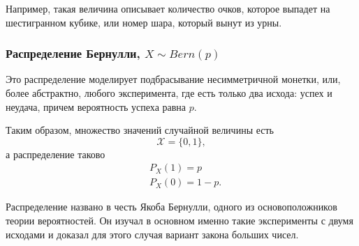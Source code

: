 \documentclass[a4paper,12pt]{article}
\newcounter{z-counter}
\newcounter{th-counter}
\begin{document}
Например, такая величина описывает количество очков, которое выпадет на шестигранном кубике, или номер шара, который вынут из урны.

\subsubsection*{Распределение Бернулли, $X \sim Bern(p)$}
Это распределение моделирует подбрасывание несимметричной монетки, или, более абстрактно, любого эксперимента, где есть только два исхода: успех и неудача, причем вероятность успеха равна $p$.

Таким образом, множество значений случайной величины есть
\[
\mathcal{X} = \{0, 1\},
\]
а распределение таково
\begin{align*}
    &P_X(1) = p\\
    &P_X(0) = 1-p. 
\end{align*}

Распределение названо в честь Якоба Бернулли, одного из основоположников теории вероятностей. Он изучал в основном именно такие эксперименты с двумя исходами и доказал для этого случая вариант закона больших чисел.

\begin{center}
\end{center}
\end{document}

